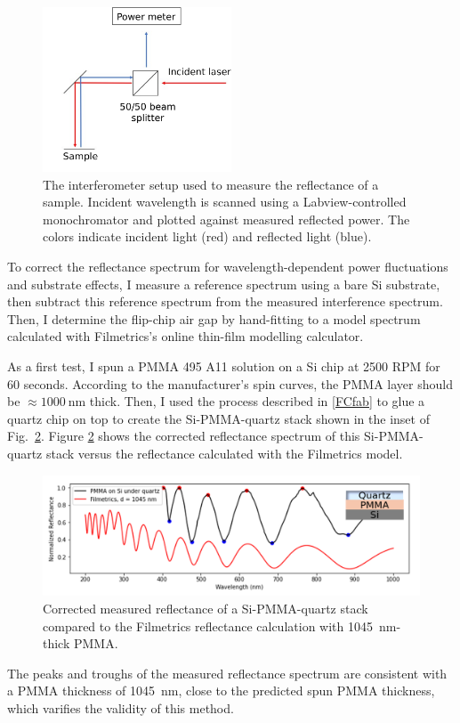 \documentclass[double,12pt,1in,seploa]{beavtex}
\begin{document}
\begin{figure}
    \includegraphics[width = 0.5\textwidth]{Interference spectroscopy.pdf}
    \caption{The interferometer setup used to measure the reflectance of a sample. Incident wavelength is scanned using a Labview-controlled monochromator and plotted against measured reflected power. The colors indicate incident light (red) and reflected light (blue).}
    \label{InterfSpec}
\end{figure}
To correct the reflectance spectrum for wavelength-dependent power fluctuations and substrate effects, I measure a reference spectrum using a bare Si substrate, then subtract this reference spectrum from the measured interference spectrum. Then, I determine the flip-chip air gap by hand-fitting to a model spectrum calculated with Filmetrics’s online thin-film modelling calculator. 

As a first test, I spun a PMMA 495 A11 solution on a Si chip at 2500 RPM for 60 seconds. According to the manufacturer's spin curves, the PMMA layer should be $\approx \SI{1000}{\nano\meter}$ thick. Then, I used the process described in \ref{FCfab} to glue a quartz chip on top to create the Si-PMMA-quartz stack shown in the inset of Fig.\ \ref{PMMAqzspec}. Figure \ref{PMMAqzspec} shows the corrected reflectance spectrum of this Si-PMMA-quartz stack versus the reflectance calculated with the Filmetrics model.


\begin{figure}
    \includegraphics[width=1\textwidth]{qzPMMAsi stack spec.PNG}
    \caption{Corrected measured reflectance of a Si-PMMA-quartz stack compared to the Filmetrics reflectance calculation with \SI{1045}{\nano\meter}-thick PMMA.}
    \label{PMMAqzspec}
\end{figure}
The peaks and troughs of the measured reflectance spectrum are consistent with a PMMA thickness of \SI{1045}{\nano\meter}, close to the predicted spun PMMA thickness, which varifies the validity of this method.
\end{document}
